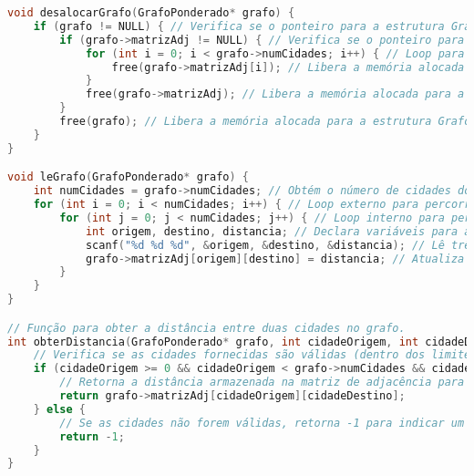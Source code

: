 \documentclass[12pt]{spieman}
\begin{document}
\begin{lstlisting}[language=C]
void desalocarGrafo(GrafoPonderado* grafo) {
    if (grafo != NULL) { // Verifica se o ponteiro para a estrutura GrafoPonderado é válido.
        if (grafo->matrizAdj != NULL) { // Verifica se o ponteiro para a matriz de adjacência é válido.
            for (int i = 0; i < grafo->numCidades; i++) { // Loop para percorrer todas as linhas da matriz.
                free(grafo->matrizAdj[i]); // Libera a memória alocada para as distâncias da cidade atual.
            }
            free(grafo->matrizAdj); // Libera a memória alocada para a matriz de adjacência em si.
        }
        free(grafo); // Libera a memória alocada para a estrutura GrafoPonderado.
    }
}

void leGrafo(GrafoPonderado* grafo) {
    int numCidades = grafo->numCidades; // Obtém o número de cidades do grafo.
    for (int i = 0; i < numCidades; i++) { // Loop externo para percorrer as cidades de origem.
        for (int j = 0; j < numCidades; j++) { // Loop interno para percorrer as cidades de destino.
            int origem, destino, distancia; // Declara variáveis para armazenar dados lidos.
            scanf("%d %d %d", &origem, &destino, &distancia); // Lê três valores da entrada padrão.
            grafo->matrizAdj[origem][destino] = distancia; // Atualiza a matriz de adjacência com a distância entre origem e destino.
        }
    }
}

// Função para obter a distância entre duas cidades no grafo.
int obterDistancia(GrafoPonderado* grafo, int cidadeOrigem, int cidadeDestino) {
    // Verifica se as cidades fornecidas são válidas (dentro dos limites do grafo).
    if (cidadeOrigem >= 0 && cidadeOrigem < grafo->numCidades && cidadeDestino >= 0 && cidadeDestino < grafo->numCidades) {
        // Retorna a distância armazenada na matriz de adjacência para as cidades fornecidas.
        return grafo->matrizAdj[cidadeOrigem][cidadeDestino];
    } else {
        // Se as cidades não forem válidas, retorna -1 para indicar um erro ou distância inválida.
        return -1;
    }
}


\end{lstlisting}
\end{document}

